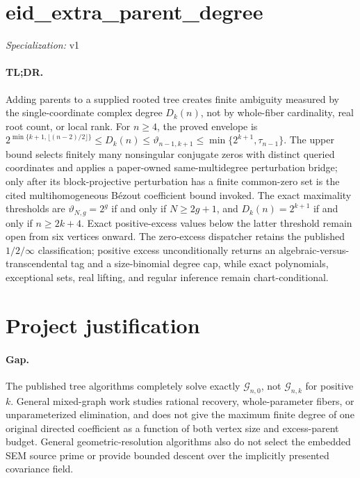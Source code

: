 \documentclass{article}
\begin{document}
\sloppy

\section*{eid\_\allowbreak{}extra\_\allowbreak{}parent\_\allowbreak{}degree}

\noindent\textit{Specialization:} v1\par

\paragraph{TL;DR.} Adding parents to a supplied rooted tree creates finite ambiguity measured by the single-coordinate complex degree \(D_k(n)\), not by whole-fiber cardinality, real root count, or local rank. For \(n\geq4\), the proved envelope is \(2^{\min\{k+1,\lfloor(n-2)/2\rfloor\}}\leq D_k(n)\leq\vartheta_{n-1,k+1}\leq\min\{2^{k+1},\tau_{n-1}\}\). The upper bound selects finitely many nonsingular conjugate zeros with distinct queried coordinates and applies a paper-owned same-multidegree perturbation bridge; only after its block-projective perturbation has a finite common-zero set is the cited multihomogeneous B\'ezout coefficient bound invoked. The exact maximality thresholds are \(\vartheta_{N,g}=2^g\) if and only if \(N\geq2g+1\), and \(D_k(n)=2^{k+1}\) if and only if \(n\geq2k+4\). Exact positive-excess values below the latter threshold remain open from six vertices onward. The zero-excess dispatcher retains the published \(1/2/\infty\) classification; positive excess unconditionally returns an algebraic-versus-transcendental tag and a size-binomial degree cap, while exact polynomials, exceptional sets, real lifting, and regular inference remain chart-conditional.

\section{Project justification}

\paragraph{Gap.} The published tree algorithms completely solve exactly \(\mathcal G_{n,0}\), not \(\mathcal G_{n,k}\) for positive \(k\). General mixed-graph work studies rational recovery, whole-parameter fibers, or unparameterized elimination, and does not give the maximum finite degree of one original directed coefficient as a function of both vertex size and excess-parent budget. General geometric-resolution algorithms also do not select the embedded SEM source prime or provide bounded descent over the implicitly presented covariance field.
\end{document}

